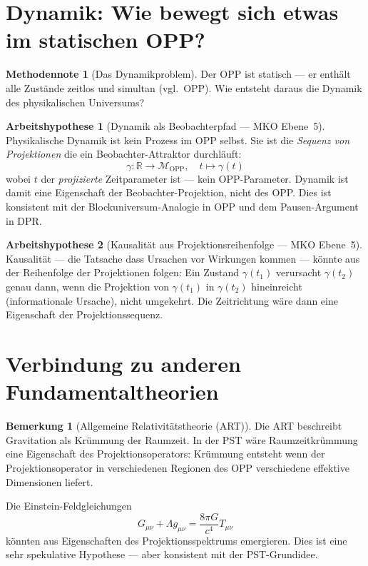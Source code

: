 \documentclass[11pt,a4paper]{article}
\theoremstyle{plain}
\theoremstyle{definition}
\newtheorem{remark}{Bemerkung}[section]
\newtheorem{methodennote}{Methodennote}[section]
\newtheorem{hypothese}{Arbeitshypothese}[section]
\newcommand{\OPP}{\mathcal{M}_{\mathrm{OPP}}}
\begin{document}
\section{Dynamik: Wie bewegt sich etwas im statischen OPP?}

\begin{methodennote}[Das Dynamikproblem]
Der OPP ist statisch --- er enth\"{a}lt alle Zust\"{a}nde zeitlos und
simultan (vgl.\ OPP). Wie entsteht daraus die Dynamik des physikalischen
Universums?
\end{methodennote}

\begin{hypothese}[Dynamik als Beobachterpfad --- MKO Ebene~5]
Physikalische Dynamik ist kein Prozess im OPP selbst. Sie ist die
\emph{Sequenz von Projektionen} die ein Beobachter-Attraktor durchl\"{a}uft:
\[
  \gamma\colon \mathbb{R} \rightarrow \OPP,
  \quad
  t \mapsto \gamma(t)
\]
wobei $t$ der \emph{projizierte} Zeitparameter ist --- kein OPP-Parameter.
Dynamik ist damit eine Eigenschaft der Beobachter-Projektion, nicht
des OPP. Dies ist konsistent mit der Blockuniversum-Analogie in OPP
und dem Pausen-Argument in DPR.
\end{hypothese}

\begin{hypothese}[Kausalit\"{a}t aus Projektionsreihenfolge ---
MKO Ebene~5]
Kausalit\"{a}t --- die Tatsache dass Ursachen vor Wirkungen kommen ---
k\"{o}nnte aus der Reihenfolge der Projektionen folgen: Ein Zustand
$\gamma(t_1)$ verursacht $\gamma(t_2)$ genau dann, wenn die Projektion
von $\gamma(t_1)$ in $\gamma(t_2)$ hineinreicht (informationale Ursache),
nicht umgekehrt. Die Zeitrichtung w\"{a}re dann eine Eigenschaft der
Projektionssequenz.
\end{hypothese}

\section{Verbindung zu anderen Fundamentaltheorien}

\begin{remark}[Allgemeine Relativit\"{a}tstheorie (ART)]
Die ART beschreibt Gravitation als Kr\"{u}mmung der Raumzeit. In der PST
w\"{a}re Raumzeitkr\"{u}mmung eine Eigenschaft des Projektionsoperators:
Kr\"{u}mmung entsteht wenn der Projektionsoperator in verschiedenen
Regionen des OPP verschiedene effektive Dimensionen liefert.

Die Einstein-Feldgleichungen
\[
  G_{\mu\nu} + \Lambda g_{\mu\nu} = \frac{8\pi G}{c^4} T_{\mu\nu}
\]
k\"{o}nnten aus Eigenschaften des Projektionsspektrums emergieren. Dies
ist eine sehr spekulative Hypothese --- aber konsistent mit der
PST-Grundidee.
\end{remark}
\end{document}
